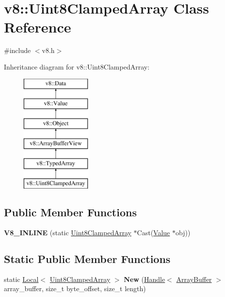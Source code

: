 \hypertarget{classv8_1_1_uint8_clamped_array}{}\section{v8\+:\+:Uint8\+Clamped\+Array Class Reference}
\label{classv8_1_1_uint8_clamped_array}


{\ttfamily \#include $<$v8.\+h$>$}

Inheritance diagram for v8\+:\+:Uint8\+Clamped\+Array\+:\begin{figure}[H]
\begin{center}
\leavevmode
\includegraphics[height=6.000000cm]{classv8_1_1_uint8_clamped_array}
\end{center}
\end{figure}
\subsection*{Public Member Functions}
\begin{DoxyCompactItemize}
\item 
\hypertarget{classv8_1_1_uint8_clamped_array_ab129afb47932f93e1ca513828124ea70}{}{\bfseries V8\+\_\+\+I\+N\+L\+I\+N\+E} (static \hyperlink{classv8_1_1_uint8_clamped_array}{Uint8\+Clamped\+Array} $\ast$Cast(\hyperlink{classv8_1_1_value}{Value} $\ast$obj))\label{classv8_1_1_uint8_clamped_array_ab129afb47932f93e1ca513828124ea70}

\end{DoxyCompactItemize}
\subsection*{Static Public Member Functions}
\begin{DoxyCompactItemize}
\item 
\hypertarget{classv8_1_1_uint8_clamped_array_ac1979cc1d0591a35e412a0fde9572667}{}static \hyperlink{classv8_1_1_local}{Local}$<$ \hyperlink{classv8_1_1_uint8_clamped_array}{Uint8\+Clamped\+Array} $>$ {\bfseries New} (\hyperlink{classv8_1_1_handle}{Handle}$<$ \hyperlink{classv8_1_1_array_buffer}{Array\+Buffer} $>$ array\+\_\+buffer, size\+\_\+t byte\+\_\+offset, size\+\_\+t length)\label{classv8_1_1_uint8_clamped_array_ac1979cc1d0591a35e412a0fde9572667}

\end{DoxyCompactItemize}
